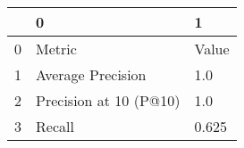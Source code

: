 \begin{tabular}{lll}
\toprule
{} &                       0 &      1 \\
\midrule
0 &                  Metric &  Value \\
1 &       Average Precision &    1.0 \\
2 &  Precision at 10 (P@10) &    1.0 \\
3 &                  Recall &  0.625 \\
\bottomrule
\end{tabular}
